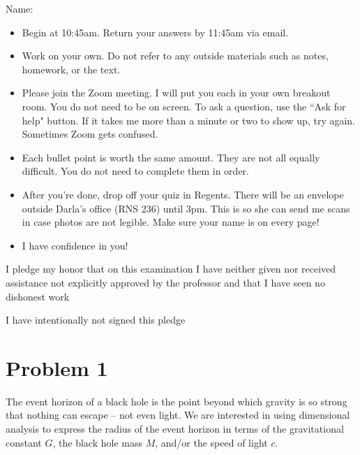 \documentclass{article}
\begin{document}
Name: \makebox[2in]{\hrulefill}

\vspace{0.5in}

\begin{itemize}
    \item Begin at 10:45am. Return your answers by 11:45am via email. 
    \item Work on your own. Do not refer to any outside materials such as notes, homework, or the text.
    \item Please join the Zoom meeting. I will put you each in your own breakout room. You do not need to be on screen. To ask a question, use the ``Ask for help" button. If it takes me more than a minute or two to show up, try again. Sometimes Zoom gets confused.
    \item Each bullet point is worth the same amount. They are not all equally difficult. You do not need to complete them in order.
    \item After you're done, drop off your quiz in Regents. There will be an envelope outside Darla's office (RNS 236) until 3pm. This is so she can send me scans in case photos are not legible. Make sure your name is on every page!
    \item I have confidence in you!
\end{itemize}

\vfill

I pledge my honor that on this examination I have neither given nor received assistance not explicitly approved by the professor and that I have seen no dishonest work \makebox[2in]{\hrulefill}

\vspace{0.5in}

I have intentionally not signed this pledge \makebox[2in]{\hrulefill}

\newpage

\section*{Problem 1}

The event horizon of a black hole is the point beyond which gravity is so strong that nothing can escape -- not even light. We are interested in using dimensional analysis to express the radius of the event horizon in terms of the gravitational constant $G$, the black hole mass $M$, and/or the speed of light $c$. 
\end{document}
